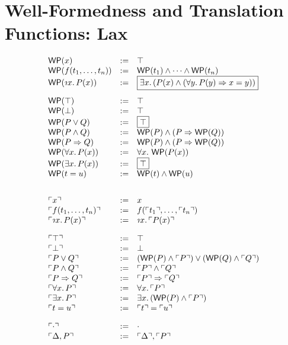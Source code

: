 \documentclass[10pt,a4paper]{article}
\begin{document}

\section{Well-Formedness and Translation Functions: Lax}


\[
\begin{array}{lll}
  \wp{\x} & := & \pTrue\\
  \wp{\tFun{\f}{\t}{n}} & := & \pAnd{\wp{\t_1}}{\pAnd{\cdots}{\wp{\t_n}}}\\
  \wp{\tDesc{\x}{\I}{\p(\x)}} & := &
\mbox{\fbox{$
        \pExists{\x}{\I}{(\pAnd{\p(\x)}{(\pForall{\y}{\I}
               {\pImply{\p(\y)}{\x=\y}})})}$}}\\[10pt]

  \wp{\pTrue} & := & \pTrue\\
  \wp{\pFalse} & := & \pTrue\\
  \wp{\pOr{\p}{\q}} & := & \mbox{\fbox{$\pTrue$}}\\
  \wp{\pAnd{\p}{\q}} & := & \pAnd{\wp{\p}}{(\pImply{\p}{\wp{\q}})}\\
  \wp{\pImply{\p}{\q}} & := & \pAnd{\wp{\p}}{(\pImply{\p}{\wp{\q}})}\\
  \wp{\pForall{\x}{\I}{\p(\x)}} & := & \pForall{\x}{\I}{\wp{\p(\x)}}\\
  \wp{\pExists{\x}{\I}{\p(\x)}} & := & \mbox{\fbox{$\pTrue$}}\\
  \wp{\pEqual{\t}{\u}} & := & \pAnd{\wp{\t}}{\wp{\u}}\\[20pt]
  
  \trans{\x} & := & \x\\
  \trans{\tFun{\f}{\t}{n}} & := & \f(\trans{\t_1},\ldots,\trans{\t_n})\\
  \trans{\tDesc{\x}{\I}{\p(\x)}} & := & \tDesc{\x}{\I}{\trans{\p(\x)}}\\[10pt]
  
  \trans{\pTrue} & := & \pTrue\\
  \trans{\pFalse} & := & \pFalse\\
  \trans{\pOr{\p}{\q}} & := & \pOr{(\pAnd{\wp{\p}}{\trans{\p}})}{(\pAnd{\wp{\q}}{\trans{\q}})}\\
  \trans{\pAnd{\p}{\q}} & := & \pAnd{\trans{\p}}{\trans{\q}}\\
  \trans{\pImply{\p}{\q}} & := & \pImply{\trans{\p}}{\trans{\q}}\\
  \trans{\pForall{\x}{\I}{\p}} & := & \pForall{\x}{\I}{\trans{\p}} \\
  \trans{\pExists{\x}{\I}{\p}} & := & \pExists{\x}{\I}{(\pAnd{\wp{\p}}{\trans{\p}})}\\
  \trans{\pEqual{\t}{\u}} & := & \pEqual{\trans{\t}}{\trans{\u}}\\[10pt]
  
  \trans{\emptyCtx} & := & \emptyCtx\\
  \trans{\D,\p} & := & \trans{\D},\trans{\p}\\
\end{array}
\]
\end{document}

